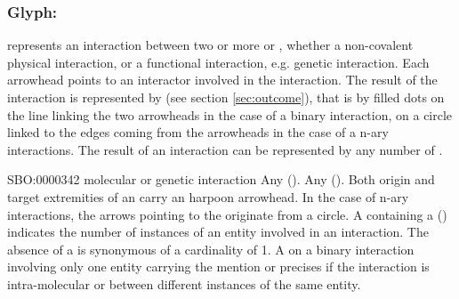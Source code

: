\color{blue}

\subsubsection{Glyph: }\label{sec:interaction}

 represents an interaction between two or more  or , whether a non-covalent physical interaction, or a functional interaction, e.g. genetic interaction. Each arrowhead points to an interactor involved in the interaction. The result of the interaction is represented by  (see section \ref{sec:outcome}), that is by filled dots on the line linking the two arrowheads in the case of a binary interaction, on a circle linked to the edges coming from the arrowheads in the case of a  n-ary interactions. The result of an interaction can be represented by any number of .

\begin{glyphDescription}
 \glyphSboTerm SBO:0000342 molecular or genetic interaction
 \glyphOrigin Any  ().%
 \glyphTarget Any  ().%
 \glyphEndPoint Both origin and target extremities of an  carry an harpoon arrowhead. In the case of n-ary interactions, the arrows pointing to the  originate from a circle. 
\glyphAux A  containing a  () indicates the number of instances of an entity involved in an interaction. The absence of a  is synonymous of a cardinality of 1. A  on a binary interaction involving only one entity carrying the mention  or  precises if the interaction is intra-molecular or between different instances of the same entity.
 \end{glyphDescription}

